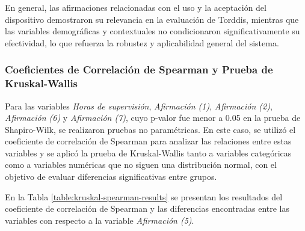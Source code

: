 En general, las afirmaciones relacionadas con el uso y la aceptación del dispositivo demostraron su relevancia en la evaluación de Torddis, mientras que las variables demográficas y contextuales no condicionaron significativamente su efectividad, lo que refuerza la robustez y aplicabilidad general del sistema.

\subsubsection{Coeficientes de Correlación de Spearman y Prueba de Kruskal-Wallis}
Para las variables \textit{Horas de supervisión}, \textit{Afirmación (1)}, \textit{Afirmación (2)}, \textit{Afirmación (6)} y \textit{Afirmación (7)}, cuyo p-valor fue menor a 0.05 en la prueba de Shapiro-Wilk, se realizaron pruebas no paramétricas. En este caso, se utilizó el coeficiente de correlación de Spearman para analizar las relaciones entre estas variables y se aplicó la prueba de Kruskal-Wallis tanto a variables categóricas como a variables numéricas que no siguen una distribución normal, con el objetivo de evaluar diferencias significativas entre grupos.

En la Tabla \ref{table:kruskal-spearman-results} se presentan los resultados del coeficiente de correlación de Spearman y las diferencias encontradas entre las variables con respecto a la variable \textit{Afirmación (5)}.

